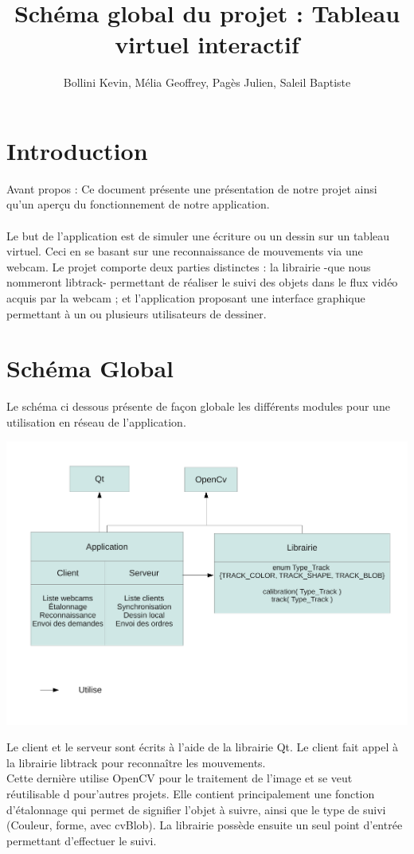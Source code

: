 \documentclass{article}
\title{Schéma global du projet : Tableau virtuel interactif}
\author{Bollini Kevin, Mélia Geoffrey, Pagès Julien, Saleil Baptiste}
\begin{document}
\maketitle

\section{Introduction}
Avant propos : Ce document présente une présentation de notre projet ainsi qu'un aperçu du fonctionnement de notre application.
\paragraph{}
Le but de l’application est de simuler une écriture ou un dessin sur un tableau virtuel. Ceci en se basant sur une
reconnaissance de mouvements via une webcam. Le projet comporte deux parties distinctes : 
la librairie -que nous nommeront libtrack- permettant de réaliser le suivi des objets dans le flux vidéo acquis par la webcam ; et l'application proposant une interface graphique permettant à un ou plusieurs utilisateurs de dessiner.


\section{Schéma Global}
Le schéma ci dessous présente de façon globale les différents modules pour une utilisation en réseau de l'application.
	\begin{center}
	\includegraphics[scale=0.5]{schema_global.pdf}
	\end{center}
Le client et le serveur sont écrits à l'aide de la librairie Qt. Le client fait appel à la librairie libtrack pour reconnaître les mouvements. \\
Cette dernière utilise OpenCV pour le traitement de l'image et se veut réutilisable d pour'autres projets. 
Elle contient principalement une fonction d'étalonnage qui permet de signifier l'objet à suivre, ainsi que le type de suivi (Couleur, forme, avec cvBlob). La librairie possède ensuite un seul point d'entrée permettant d'effectuer le suivi.
\end{document}
